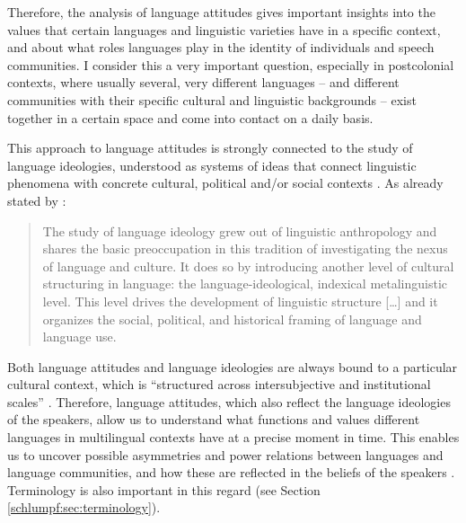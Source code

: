 \documentclass[output=paper]{langscibook}
\begin{document}
Therefore, the analysis of language attitudes gives important insights into the values that certain languages and linguistic varieties have in a specific context, and about what roles languages play in the identity of individuals and speech communities. I consider this a very important question, especially in postcolonial contexts, where usually several, very different languages – and different communities with their specific cultural and linguistic backgrounds – exist together in a certain space and come into contact on a daily basis.

This approach to language attitudes is strongly connected to the study of language ideologies, understood as systems of ideas that connect linguistic phenomena with concrete cultural, political and/or social contexts \citep[19–20]{del_valle_glotopolitica_2007}. As already stated by \citet[518]{blommaert_language_2006}:

\begin{quote}
The study of language ideology grew out of linguistic anthropology and shares the basic preoccupation in this tradition of investigating the nexus of language and culture. It does so by introducing another level of cultural structuring in language: the language-ideological, indexical metalinguistic level. This level drives the development of linguistic structure […] and it organizes the social, political, and historical framing of language and language use.
\end{quote}

Both language attitudes and language ideologies are always bound to a particular cultural context, which is “structured across intersubjective and institutional scales” \citep[117]{garcia_language_2017}. Therefore, language attitudes, which also reflect the language ideologies of the speakers, allow us to understand what functions and values different languages in multilingual contexts have at a precise moment in time. This enables us to uncover possible asymmetries and power relations between languages and language communities, and how these are reflected in the beliefs of the speakers \citep[1]{bouchard_postcolonial_2022}. Terminology is also important in this regard (see Section \ref{schlumpf:sec:terminology}).
\end{document}

